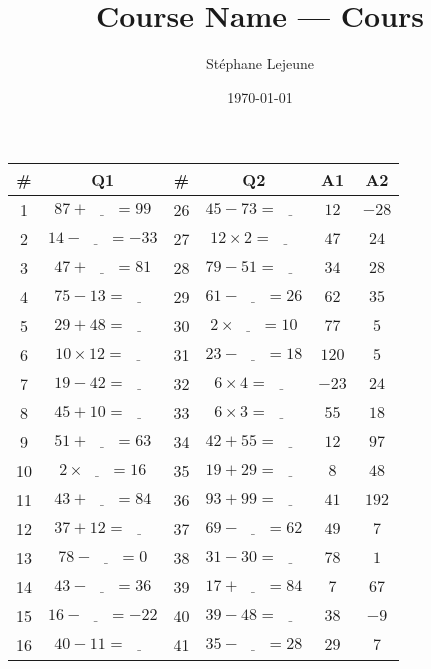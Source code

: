 \documentclass[french,a4paper,10pt]{article}
\title{\color{astral} \sffamily \bfseries Course Name --- Cours}
\author{Stéphane Lejeune}
\date{\today}
\begin{document}
\noindent
\begin{tabular}{|c|c|c|c||c|c|}
\hline
\# & Q1 & \# & Q2 & A1 & A2 \\
\hline
1 & $87 + \underline{\phantom{999}} = 99$ & 26 & $45 - 73 = \underline{\phantom{999}}$ & $12$ & $-28$ \\
\hline
2 & $14 - \underline{\phantom{999}} = -33$ & 27 & $12 \times 2 = \underline{\phantom{999}}$ & $47$ & $24$ \\
\hline
3 & $47 + \underline{\phantom{999}} = 81$ & 28 & $79 - 51 = \underline{\phantom{999}}$ & $34$ & $28$ \\
\hline
4 & $75 - 13 = \underline{\phantom{999}}$ & 29 & $61 - \underline{\phantom{999}} = 26$ & $62$ & $35$ \\
\hline
5 & $29 + 48 = \underline{\phantom{999}}$ & 30 & $2 \times \underline{\phantom{999}} = 10$ & $77$ & $5$ \\
\hline
6 & $10 \times 12 = \underline{\phantom{999}}$ & 31 & $23 - \underline{\phantom{999}} = 18$ & $120$ & $5$ \\
\hline
7 & $19 - 42 = \underline{\phantom{999}}$ & 32 & $6 \times 4 = \underline{\phantom{999}}$ & $-23$ & $24$ \\
\hline
8 & $45 + 10 = \underline{\phantom{999}}$ & 33 & $6 \times 3 = \underline{\phantom{999}}$ & $55$ & $18$ \\
\hline
9 & $51 + \underline{\phantom{999}} = 63$ & 34 & $42 + 55 = \underline{\phantom{999}}$ & $12$ & $97$ \\
\hline
10 & $2 \times \underline{\phantom{999}} = 16$ & 35 & $19 + 29 = \underline{\phantom{999}}$ & $8$ & $48$ \\
\hline
11 & $43 + \underline{\phantom{999}} = 84$ & 36 & $93 + 99 = \underline{\phantom{999}}$ & $41$ & $192$ \\
\hline
12 & $37 + 12 = \underline{\phantom{999}}$ & 37 & $69 - \underline{\phantom{999}} = 62$ & $49$ & $7$ \\
\hline
13 & $78 - \underline{\phantom{999}} = 0$ & 38 & $31 - 30 = \underline{\phantom{999}}$ & $78$ & $1$ \\
\hline
14 & $43 - \underline{\phantom{999}} = 36$ & 39 & $17 + \underline{\phantom{999}} = 84$ & $7$ & $67$ \\
\hline
15 & $16 - \underline{\phantom{999}} = -22$ & 40 & $39 - 48 = \underline{\phantom{999}}$ & $38$ & $-9$ \\
\hline
16 & $40 - 11 = \underline{\phantom{999}}$ & 41 & $35 - \underline{\phantom{999}} = 28$ & $29$ & $7$ \\

\end{tabular}
\end{document}
